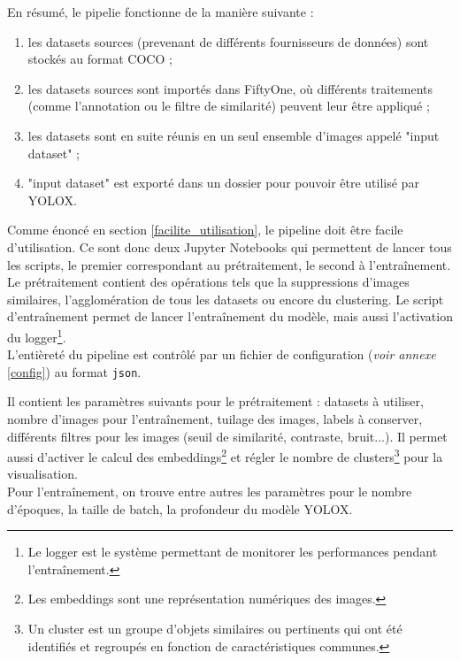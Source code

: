 En résumé, le pipelie fonctionne de la manière suivante :

\begin{enumerate}
    \item les datasets sources (prevenant de différents fournisseurs de données) sont stockés au format
    COCO ;
    \item les datasets sources sont importés dans FiftyOne, où différents traitements (comme
    l'annotation ou le filtre de similarité) peuvent leur être appliqué ;
    \item les datasets sont en suite réunis en un seul ensemble d'images appelé "input dataset" ;
    \item "input dataset" est exporté dans un dossier pour pouvoir être utilisé par YOLOX.
\end{enumerate}

Comme énoncé en section \ref{facilite_utilisation}, le pipeline doit être facile d'utilisation.
Ce sont donc deux Jupyter Notebooks qui permettent de lancer tous les scripts, le premier correspondant
au prétraitement, le second à l'entraînement. Le prétraitement contient des opérations tels que
la suppressions d'images similaires, l'agglomération de tous les datasets ou encore du clustering.
Le script d'entraînement permet de lancer l'entraînement du modèle, mais aussi l'activation du
logger\footnote{Le logger est le système permettant de monitorer les performances pendant l'entraînement.}.\\


L'entièreté du pipeline est contrôlé par un fichier de configuration (\textit{voir annexe} \ref{config})
au format \texttt{json}.

Il contient les paramètres suivants pour le prétraitement : datasets à utiliser, nombre d'images pour
l'entraînement, tuilage des images, labels à conserver, différents filtres pour les images (seuil de
similarité, contraste, bruit...). Il permet aussi d'activer le calcul des embeddings\footnote{
Les embeddings sont une représentation numériques des images.}
et régler le nombre de clusters\footnote{Un cluster est un groupe d'objets similaires ou pertinents
qui ont été identifiés et regroupés en fonction de caractéristiques communes.} pour la visualisation.\\

Pour l'entraînement, on trouve entre autres les paramètres pour le nombre d'époques, la taille de batch,
la profondeur du modèle YOLOX.\\

